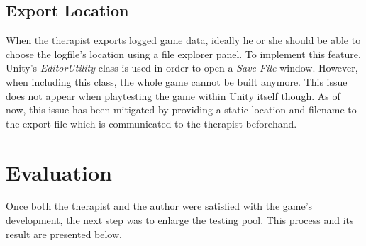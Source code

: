 \documentclass[draft,final]{vutinfth} %
\begin{document}
\subsection{Export Location}
When the therapist exports logged game data, ideally he or she should be able to choose the logfile's location using a file explorer panel. To implement this feature, Unity's \emph{EditorUtility} class is used in order to open a \emph{Save-File}-window. However, when including this class, the whole game cannot be built anymore. This issue does not appear when playtesting the game within Unity itself though. As of now, this issue has been mitigated by providing a static location and filename to the export file which is communicated to the therapist beforehand.
\section{Evaluation}
Once both the therapist and the author were satisfied with the game's development, the next step was to enlarge the testing pool. This process and its result are presented below.
\end{document}
